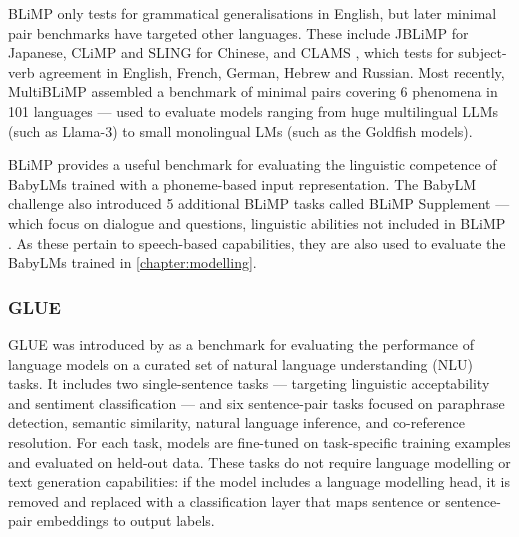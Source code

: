 BLiMP only tests for grammatical generalisations in English, but later minimal pair benchmarks have targeted other languages. These include JBLiMP \citep{someya-oseki-2023-jblimp} for Japanese, CLiMP \citep{xiang-etal-2021-climp} and SLING \citep{song-etal-2022-sling} for Chinese, and CLAMS \citep{mueller-etal-2020-cross}, which tests for subject-verb agreement in English, French, German, Hebrew and Russian. Most recently, MultiBLiMP assembled a benchmark of minimal pairs covering 6 phenomena in 101 languages \citep{jumelet2025multiblimp10massivelymultilingual} --- used to evaluate models ranging from huge multilingual LLMs (such as Llama-3) to small monolingual LMs (such as the Goldfish models).%

BLiMP provides a useful benchmark for evaluating the linguistic competence of BabyLMs trained with a phoneme-based input representation. The BabyLM challenge also introduced 5 additional BLiMP tasks called BLiMP Supplement --- which focus on dialogue and questions, linguistic abilities not included in BLiMP \citep{warstadt-2023-babylm-findings}. As these pertain to speech-based capabilities, they are also used to evaluate the BabyLMs trained in \cref{chapter:modelling}.  


\subsubsection{GLUE}\label{sec:12-glue}

GLUE was introduced by \citet{wang-etal-2018-glue} as a benchmark for evaluating the performance of language models on a curated set of natural language understanding (NLU) tasks. It includes two single-sentence tasks --- targeting linguistic acceptability and sentiment classification --- and six sentence-pair tasks focused on paraphrase detection, semantic similarity, natural language inference, and co-reference resolution. For each task, models are fine-tuned on task-specific training examples and evaluated on held-out data. These tasks do not require language modelling or text generation capabilities: if the model includes a language modelling head, it is removed and replaced with a classification layer that maps sentence or sentence-pair embeddings to output labels.

